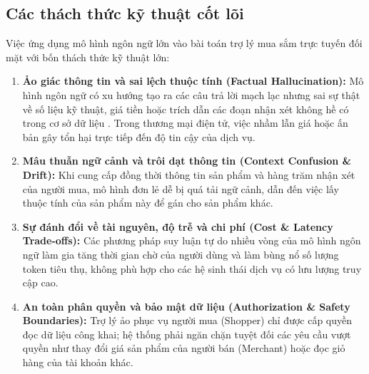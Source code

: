 \subsection{Các thách thức kỹ thuật cốt lõi}
Việc ứng dụng mô hình ngôn ngữ lớn vào bài toán trợ lý mua sắm trực tuyến đối mặt với bốn thách thức kỹ thuật lớn:

\begin{enumerate}
    \item \textbf{Ảo giác thông tin và sai lệch thuộc tính (Factual Hallucination):} Mô hình ngôn ngữ có xu hướng tạo ra các câu trả lời mạch lạc nhưng sai sự thật về số liệu kỹ thuật, giá tiền hoặc trích dẫn các đoạn nhận xét không hề có trong cơ sở dữ liệu . Trong thương mại điện tử, việc nhầm lẫn giá hoặc ấn bản gây tổn hại trực tiếp đến độ tin cậy của dịch vụ.
    \item \textbf{Mâu thuẫn ngữ cảnh và trôi dạt thông tin (Context Confusion \& Drift):} Khi cung cấp đồng thời thông tin sản phẩm và hàng trăm nhận xét của người mua, mô hình đơn lẻ dễ bị quá tải ngữ cảnh, dẫn đến việc lấy thuộc tính của sản phẩm này để gán cho sản phẩm khác.
    \item \textbf{Sự đánh đổi về tài nguyên, độ trễ và chi phí (Cost \& Latency Trade-offs):} Các phương pháp suy luận tự do nhiều vòng của mô hình ngôn ngữ làm gia tăng thời gian chờ của người dùng và làm bùng nổ số lượng token tiêu thụ, không phù hợp cho các hệ sinh thái dịch vụ có lưu lượng truy cập cao.
    \item \textbf{An toàn phân quyền và bảo mật dữ liệu (Authorization \& Safety Boundaries):} Trợ lý ảo phục vụ người mua (Shopper) chỉ được cấp quyền đọc dữ liệu công khai; hệ thống phải ngăn chặn tuyệt đối các yêu cầu vượt quyền như thay đổi giá sản phẩm của người bán (Merchant) hoặc đọc giỏ hàng của tài khoản khác.
\end{enumerate}

